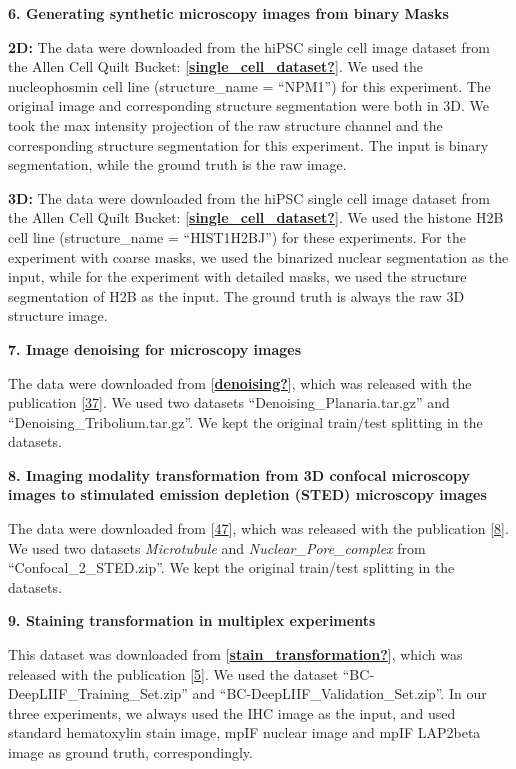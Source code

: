 \textbf{6. Generating synthetic microscopy images from binary Masks}

\textbf{2D:} The data were downloaded from the hiPSC single cell image dataset from the Allen Cell Quilt Bucket: {[}\protect\hyperlink{ref-single_cell_dataset}{\textbf{single\_cell\_dataset?}}{]}. We used the nucleophosmin cell line (structure\_name = ``NPM1'') for this experiment. The original image and corresponding structure segmentation were both in 3D. We took the max intensity projection of the raw structure channel and the corresponding structure segmentation for this experiment. The input is binary segmentation, while the ground truth is the raw image.

\textbf{3D:} The data were downloaded from the hiPSC single cell image dataset from the Allen Cell Quilt Bucket: {[}\protect\hyperlink{ref-single_cell_dataset}{\textbf{single\_cell\_dataset?}}{]}. We used the histone H2B cell line (structure\_name = ``HIST1H2BJ'') for these experiments. For the experiment with coarse masks, we used the binarized nuclear segmentation as the input, while for the experiment with detailed masks, we used the structure segmentation of H2B as the input. The ground truth is always the raw 3D structure image.

\textbf{7. Image denoising for microscopy images}

The data were downloaded from {[}\protect\hyperlink{ref-denoising}{\textbf{denoising?}}{]}, which was released with the publication {[}\protect\hyperlink{ref-12G712Zky}{37}{]}. We used two datasets ``Denoising\_Planaria.tar.gz'' and ``Denoising\_Tribolium.tar.gz''. We kept the original train/test splitting in the datasets.

\textbf{8. Imaging modality transformation from 3D confocal microscopy images to stimulated emission depletion (STED) microscopy images}

The data were downloaded from {[}\protect\hyperlink{ref-ExHf2uD2}{47}{]}, which was released with the publication {[}\protect\hyperlink{ref-UEBDZ3tI}{8}{]}. We used two datasets \emph{Microtubule} and \emph{Nuclear\_Pore\_complex} from ``Confocal\_2\_STED.zip''. We kept the original train/test splitting in the datasets.

\textbf{9. Staining transformation in multiplex experiments}

This dataset was downloaded from {[}\protect\hyperlink{ref-stain_transformation}{\textbf{stain\_transformation?}}{]}, which was released with the publication {[}\protect\hyperlink{ref-WwenuBHa}{5}{]}. We used the dataset ``BC-DeepLIIF\_Training\_Set.zip'' and ``BC-DeepLIIF\_Validation\_Set.zip''. In our three experiments, we always used the IHC image as the input, and used standard hematoxylin stain image, mpIF nuclear image and mpIF LAP2beta image as ground truth, correspondingly.


